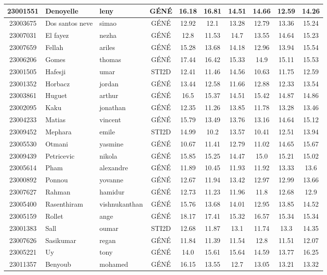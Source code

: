 \documentclass{article}%
\begin{document}
\begin{tabular}{|c|l|l|c|c|c|c|c|c|c|}
\hline%
23001551&Denoyelle&leny&GÉNÉ&16.18&16.81&14.51&14.66&12.59&14.26\\%
\hline%
23003675&Dos santos neve&simao&GÉNÉ&12.92&12.1&13.28&12.79&13.36&15.24\\%
\hline%
23007031&El fayez&nezha&GÉNÉ&12.8&11.53&14.7&13.55&14.64&15.23\\%
\hline%
23007659&Fellah&ariles&GÉNÉ&15.28&13.68&14.18&12.96&13.94&15.54\\%
\hline%
23006206&Gomes&thomas&GÉNÉ&17.44&16.42&15.33&14.9&15.11&15.53\\%
\hline%
23001505&Hafesji&umar&STI2D&12.41&11.46&14.56&10.63&11.75&12.59\\%
\hline%
23001352&Horbacz&jordan&GÉNÉ&13.44&12.58&11.66&12.88&12.33&13.54\\%
\hline%
23003861&Huguet&arthur&GÉNÉ&16.5&15.37&14.51&15.42&14.87&14.86\\%
\hline%
23002095&Kaku&jonathan&GÉNÉ&12.35&11.26&13.85&11.78&13.28&13.46\\%
\hline%
23004233&Matias&vincent&GÉNÉ&15.79&13.49&13.76&13.16&14.64&15.12\\%
\hline%
23009452&Mephara&emile&STI2D&14.99&10.2&13.57&10.41&12.51&13.94\\%
\hline%
23005530&Otmani&yasmine&GÉNÉ&10.67&11.41&12.79&11.02&14.65&15.67\\%
\hline%
23009439&Petricevic&nikola&GÉNÉ&15.85&15.25&14.47&15.0&15.21&15.02\\%
\hline%
23005614&Pham&alexandre&GÉNÉ&11.89&10.45&11.93&11.92&13.33&13.6\\%
\hline%
23000892&Ponnou&yovanne&GÉNÉ&12.67&11.94&13.42&12.97&12.99&13.66\\%
\hline%
23007627&Rahman&hamidur&GÉNÉ&12.73&11.23&11.96&11.8&12.68&12.9\\%
\hline%
23005400&Rasenthiram&vishnukanthan&GÉNÉ&15.76&13.68&14.01&12.95&13.85&14.52\\%
\hline%
23005159&Rollet&ange&GÉNÉ&18.17&17.41&15.32&16.57&15.34&15.34\\%
\hline%
23001383&Sall&oumar&STI2D&12.68&11.87&13.1&11.74&13.3&14.35\\%
\hline%
23007626&Sasikumar&regan&GÉNÉ&11.84&11.39&11.54&12.8&11.51&12.07\\%
\hline%
23005221&Uy&tony&GÉNÉ&14.0&15.61&15.64&14.59&13.77&16.25\\%
\hline%
23011357&Benyoub&mohamed&GÉNÉ&16.15&13.55&12.7&13.05&13.21&13.32\\%
\hline%
\end{tabular}
\end{document}
